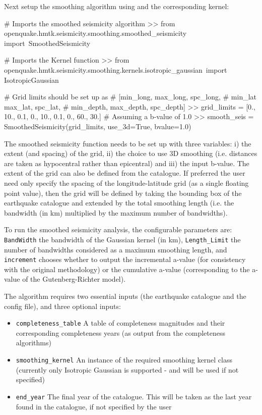 Next setup the smoothing algorithm using and the corresponding kernel:

\begin{python}[frame=single]

# Imports the smoothed seismicity algorithm
>> from openquake.hmtk.seismicity.smoothing.smoothed_seismicity import\
    SmoothedSeismicity

# Imports the Kernel function
>> from openquake.hmtk.seismicity.smoothing.kernels.isotropic_gaussian\
    import IsotropicGaussian

# Grid limits should be set up as 
# [min_long, max_long, spc_long, 
#  min_lat max_lat, spc_lat,
#  min_depth, max_depth, spc_depth]
>> grid_limits = [0., 10., 0.1, 0., 10., 0.1, 0., 60., 30.]
# Assuming a b-value of 1.0
>> smooth_seis = SmoothedSeismicity(grid_limits,
                                    use_3d=True,
                                    bvalue=1.0)
\end{python}

The smoothed seismicity function needs to be set up with three variables: i) the extent (and spacing) of the grid, ii) the choice to use 3D smoothing (i.e. distances are taken as hypocentral rather than epicentral) and iii) the input b-value. The extent of the grid can also be defined from the catalogue. If preferred the user need only specify the spacing of the longitude-latitude grid (as a single floating point value), then the grid will be defined by taking the bounding box of the earthquake catalogue and extended by the total smoothing length (i.e. the bandwidth (in km) multiplied by the maximum number of bandwidths). 

To run the smoothed seismicity analysis, the configurable parameters are: \verb=BandWidth= the bandwidth of the Gaussian kernel (in km), \verb=Length_Limit= the number of bandwidths considered as a maximum smoothing length, and \verb=increment= chooses whether to output the incremental a-value (for consistency with the original \textcite{frankel1995} methodology) or the cumulative a-value (corresponding to the a-value of the Gutenberg-Richter model).


The algorithm requires two essential inputs (the earthquake catalogue and the config file), and three optional inputs:

\begin{itemize}
\item \verb=completeness_table= A table of completeness magnitudes and their corresponding completeness years (as output from the completeness algorithms)

\item \verb=smoothing_kernel= An instance of the required smoothing
kernel class (currently only Isotropic Gaussian is supported - and will be used if not specified)

\item \verb=end_year= The final year of the catalogue. This will be taken as the last year found in the catalogue, if not specified by the user
\end{itemize}

